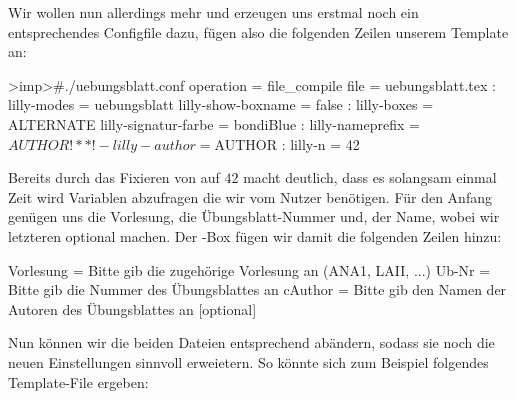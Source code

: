 Wir wollen nun allerdings mehr und erzeugen uns erstmal noch ein entsprechendes Configfile dazu, fügen also die folgenden Zeilen unserem Template an:
\begin{gepard}
>imp>#./uebungsblatt.conf
operation   = file_compile
file        = uebungsblatt.tex
:
lilly-modes = uebungsblatt
lilly-show-boxname = false
:
lilly-boxes = ALTERNATE
lilly-signatur-farbe = bondiBlue
:
lilly-nameprefix = ${AUTHOR}!**!-
lilly-author = ${AUTHOR}
:
lilly-n     = 42
\end{gepard}
Bereits durch das Fixieren von  auf $42$ macht deutlich, dass es solangsam einmal Zeit wird Variablen abzufragen die wir vom Nutzer benötigen. Für den Anfang genügen uns die Vorlesung, die Übungsblatt-Nummer und, der Name, wobei wir letzteren optional machen. Der -Box fügen wir damit die folgenden Zeilen hinzu:
{
\begin{plaingepard}
Vorlesung = Bitte gib die zugehörige Vorlesung an (ANA1, LAII, ...)
Ub-Nr     = Bitte gib die Nummer des Übungsblattes an
cAuthor   = Bitte gib den Namen der Autoren des Übungsblattes an [optional]
\end{plaingepard}
}
Nun können wir die beiden Dateien entsprechend abändern, sodass sie noch die neuen Einstellungen sinnvoll erweietern. So könnte sich zum Beispiel folgendes Template-File ergeben:
